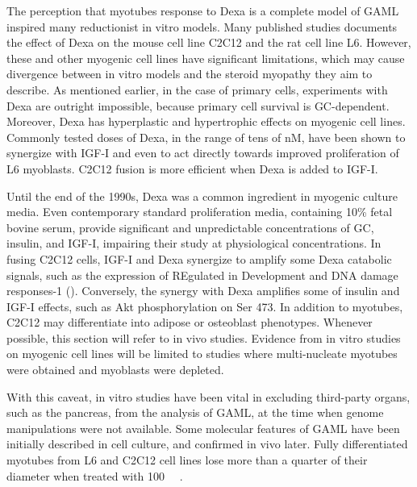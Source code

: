 \documentclass[12pt,english]{report}\usepackage[]{graphicx}\usepackage[]{color}
\begin{document}
The perception that myotubes response to Dexa is a complete model
of GAML inspired many reductionist in vitro models. Many published
studies documents the effect of Dexa on the mouse cell line C2C12
and the rat cell line L6. However, these and other myogenic cell lines
have significant limitations, which may cause divergence between in
vitro models and the steroid myopathy they aim to describe. As mentioned
earlier, in the case of primary cells, experiments with Dexa are outright
impossible, because primary cell survival is GC-dependent. Moreover,
Dexa has hyperplastic and hypertrophic effects on myogenic cell lines.
Commonly tested doses of Dexa, in the range of tens of nM, have been
shown to synergize with IGF-I \citep{giorgino1995dexamethasone} and
even to act directly towards improved proliferation of L6 myoblasts\citep{florini1979serum-free,whitson1989dexamethasone}.
C2C12 fusion is more efficient when Dexa is added to IGF-I\citep{pansters2013synergistic}.

Until the end of the 1990s, Dexa was a common ingredient in myogenic
culture media\citep{takahashi2002myogenic}. Even contemporary standard
proliferation media, containing 10\% fetal bovine serum, provide significant
and unpredictable concentrations of GC, insulin, and IGF-I, impairing
their study at physiological concentrations. In fusing C2C12 cells,
IGF-I and Dexa synergize to amplify some Dexa catabolic signals, such
as the expression of REgulated in Development and DNA damage responses-1
()\citep{pansters2013synergistic}.
Conversely, the synergy with Dexa amplifies some of insulin and IGF-I
effects, such as Akt phosphorylation on Ser 473\citep{takahashi2002myogenic}.
In addition to myotubes, C2C12 may differentiate into adipose or osteoblast
phenotypes. Whenever possible, this section will refer to in vivo
studies. Evidence from in vitro studies on myogenic cell lines will
be limited to studies where multi-nucleate myotubes were obtained
and myoblasts were depleted.

With this caveat, in vitro studies have been vital in excluding third-party
organs, such as the pancreas, from the analysis of GAML, at the time
when genome manipulations were not available. Some molecular features
of GAML have been initially described in cell culture, and confirmed
in vivo later. Fully differentiated myotubes from L6 and C2C12 cell
lines lose more than a quarter of their diameter when treated with
\SI{100}{\nano\molar} \citep{menconi2008dexamethasone}.
\end{document}
